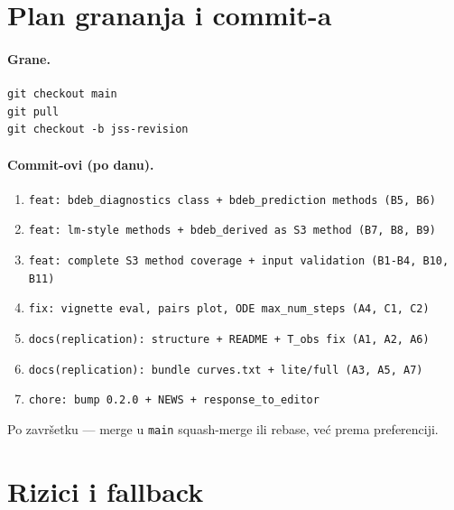 \documentclass[11pt,a4paper]{article}
\newcommand{\code}[1]{\texttt{\small #1}}
\begin{document}
\section{Plan grananja i commit-a}

\paragraph{Grane.}
\begin{lstlisting}[style=Shellstyle]
git checkout main
git pull
git checkout -b jss-revision
\end{lstlisting}

\paragraph{Commit-ovi (po danu).}
\begin{enumerate}[leftmargin=1.4em,nosep]
  \item \texttt{feat: bdeb\_diagnostics class + bdeb\_prediction methods (B5, B6)}
  \item \texttt{feat: lm-style methods + bdeb\_derived as S3 method (B7, B8, B9)}
  \item \texttt{feat: complete S3 method coverage + input validation (B1-B4, B10, B11)}
  \item \texttt{fix: vignette eval, pairs plot, ODE max\_num\_steps (A4, C1, C2)}
  \item \texttt{docs(replication): structure + README + T\_obs fix (A1, A2, A6)}
  \item \texttt{docs(replication): bundle curves.txt + lite/full (A3, A5, A7)}
  \item \texttt{chore: bump 0.2.0 + NEWS + response\_to\_editor}
\end{enumerate}

\noindent Po završetku --- merge u \code{main} squash-merge ili
rebase, već prema preferenciji.

\section{Rizici i fallback}
\end{document}
